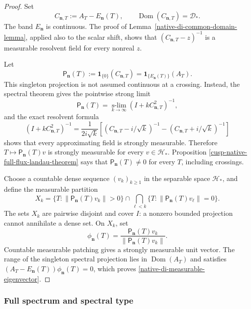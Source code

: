\begin{proof}
Set
\[
 C_{\mathbf n,T}:=A_T-E_{\mathbf n}(T),
 \qquad \operatorname{Dom}(C_{\mathbf n,T})=\mathscr D_*.
\]
The band \(E_{\mathbf n}\) is continuous.  The proof of
Lemma~\ref{native-di-common-domain-lemma}, applied also to the scalar
shift, shows that
\((C_{\mathbf n,T}-z)^{-1}\) is a measurable resolvent field for every
nonreal \(z\).

Let
\[
 \mathsf P_{\mathbf n}(T)
 :=\mathbf 1_{\{0\}}(C_{\mathbf n,T})
 =\mathbf 1_{\{E_{\mathbf n}(T)\}}(A_T).
\]
This singleton projection is not assumed continuous at a crossing.
Instead, the spectral theorem gives the pointwise strong limit
\begin{equation}
 \mathsf P_{\mathbf n}(T)
 =\operatorname*{s-lim}_{k\to\infty}
  (I+kC_{\mathbf n,T}^2)^{-1},
\label{native-di-kernel-projection}
\end{equation}
and the exact resolvent formula
\begin{equation}
 (I+kC_{\mathbf n,T}^2)^{-1}
 =\frac1{2i\sqrt{k}}
 \left[
 (C_{\mathbf n,T}-i/\sqrt{k})^{-1}
 -(C_{\mathbf n,T}+i/\sqrt{k})^{-1}
 \right]
\label{native-di-kernel-projection-resolvent}
\end{equation}
shows that every approximating field is strongly measurable.  Therefore
\(T\mapsto\mathsf P_{\mathbf n}(T)v\) is strongly measurable for every
\(v\in\mathscr H_*\).  Proposition
\ref{cusp-native-full-flux-landau-theorem} says that
\(\mathsf P_{\mathbf n}(T)\ne0\) for every \(T\), including crossings.

Choose a countable dense sequence \((v_k)_{k\ge1}\) in the separable
space \(\mathscr H_*\), and define the measurable partition
\[
 X_k=
 \{T:\|\mathsf P_{\mathbf n}(T)v_k\|>0\}
 \cap
 \bigcap_{\ell<k}
 \{T:\|\mathsf P_{\mathbf n}(T)v_\ell\|=0\}.
\]
The sets \(X_k\) are pairwise disjoint and cover \(I\): a nonzero bounded
projection cannot annihilate a dense set.  On \(X_k\), set
\[
 \phi_{\mathbf n}(T)
 =\frac{\mathsf P_{\mathbf n}(T)v_k}
 {\|\mathsf P_{\mathbf n}(T)v_k\|}.
\]
Countable measurable patching gives a strongly measurable unit vector.
The range of the singleton spectral projection lies in
\(\operatorname{Dom}(A_T)\) and satisfies
\((A_T-E_{\mathbf n}(T))\phi_{\mathbf n}(T)=0\), which proves
\eqref{native-di-measurable-eigenvector}.
\end{proof}

\subsubsection{Full spectrum and spectral type}

